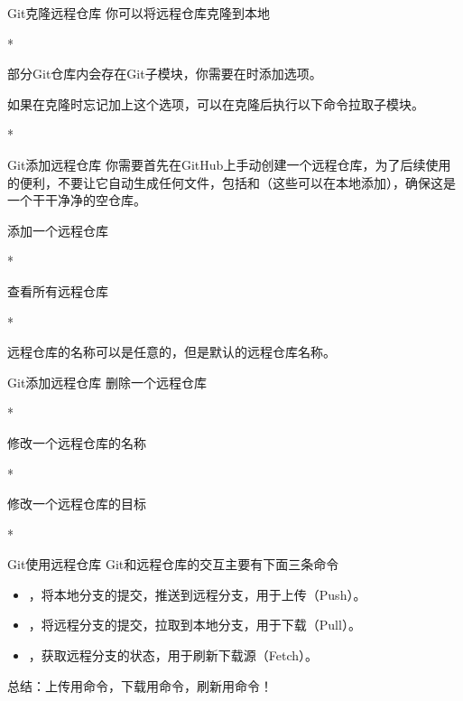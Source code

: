 \begin{frame}{Git克隆远程仓库}
    你可以将远程仓库克隆到本地
    \begin{Code}*
        
    \end{Code}
    部分Git仓库内会存在Git子模块，你需要在时添加选项。
    
    如果在克隆时忘记加上这个选项，可以在克隆后执行以下命令拉取子模块。
    \begin{Code}*
        
    \end{Code}
\end{frame}

\begin{frame}{Git添加远程仓库}
    你需要首先在GitHub上手动创建一个远程仓库，为了后续使用的便利，\alert{不要让它自动生成任何文件}，包括和（这些可以在本地添加），确保这是一个干干净净的空仓库。

    添加一个远程仓库
    \begin{Code}*
        
    \end{Code}
    查看所有远程仓库
    \begin{Code}*
        
    \end{Code}
    远程仓库的名称可以是任意的，但是默认的远程仓库名称。
\end{frame}

\begin{frame}{Git添加远程仓库}
    删除一个远程仓库
    \begin{Code}*
        
    \end{Code}
    修改一个远程仓库的名称
    \begin{Code}*
        
    \end{Code}
    修改一个远程仓库的目标
    \begin{Code}*
        
    \end{Code}
\end{frame}

\begin{frame}{Git使用远程仓库}
    Git和远程仓库的交互主要有下面三条命令
    \begin{itemize}
        \item {}，将本地分支的提交，\alert{推送}到远程分支，用于上传（Push）。
        \item {}，将远程分支的提交，\alert{拉取}到本地分支，用于下载（Pull）。
        \item {}，\alert{获取}远程分支的状态，用于刷新下载源（Fetch）。
    \end{itemize}
    总结：上传用命令，下载用命令，刷新用命令！
\end{frame}

